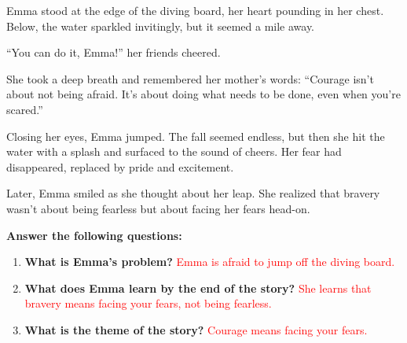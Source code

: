 \documentclass[12pt]{article}
\begin{document}
\begin{tcolorbox}[colframe=black!60, colback=white, 
coltitle=black, colbacktitle=black!15, fonttitle=\bfseries\Large, 
title=Guided Practice: \textit{Emma’s Courage}, halign title=center, left=10pt, right=10pt, top=10pt, bottom=15pt]

Emma stood at the edge of the diving board, her heart pounding in her chest. Below, the water sparkled invitingly, but it seemed a mile away.  

“You can do it, Emma!” her friends cheered.  

She took a deep breath and remembered her mother’s words: “Courage isn’t about not being afraid. It’s about doing what needs to be done, even when you’re scared.”  

Closing her eyes, Emma jumped. The fall seemed endless, but then she hit the water with a splash and surfaced to the sound of cheers. Her fear had disappeared, replaced by pride and excitement.  

Later, Emma smiled as she thought about her leap. She realized that bravery wasn’t about being fearless but about facing her fears head-on.  

\textbf{Answer the following questions:}
\begin{enumerate}[itemsep=1em]
    \item \textbf{What is Emma’s problem?}  
    \textcolor{red}{Emma is afraid to jump off the diving board.}  

    \item \textbf{What does Emma learn by the end of the story?}  
    \textcolor{red}{She learns that bravery means facing your fears, not being fearless.}  

    \item \textbf{What is the theme of the story?}  
    \textcolor{red}{Courage means facing your fears.}  
\end{enumerate}
\end{tcolorbox}

\vspace{1em}
\end{document}
